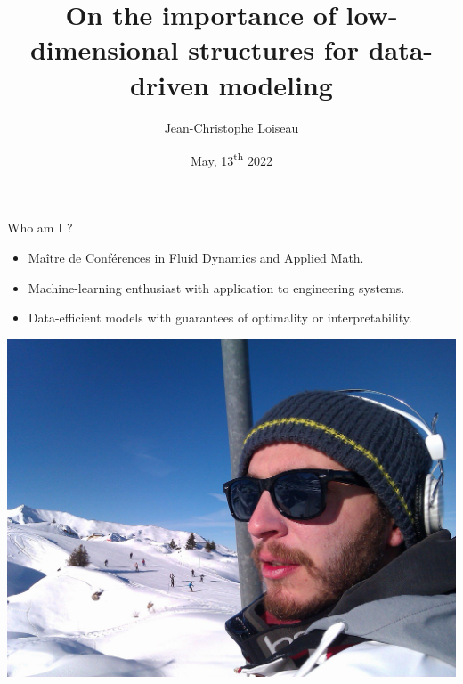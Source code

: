 \documentclass[aspectratio=169]{beamer}
\title{On the importance of low-dimensional structures for data-driven modeling}
\author[JC]{Jean-Christophe Loiseau}
\date[]{May, 13\textsuperscript{th} 2022}
\begin{document}
\begin{frame}
  \titlepage
\end{frame}







\begin{frame}{Who am I ?}
  \vfill
  \begin{minipage}{.68\textwidth}
    \begin{itemize}
    \item Maître de Conférences in Fluid Dynamics and Applied Math.

      \bigskip

    \item Machine-learning enthusiast with application to engineering systems.

      \bigskip

    \item Data-efficient models with guarantees of optimality or interpretability.
    \end{itemize}
  \end{minipage}%
  \hfill
  \begin{minipage}{.28\textwidth}
    \includegraphics[width=\textwidth]{myself}
  \end{minipage}

  \vfill
\end{frame}
\end{document}
